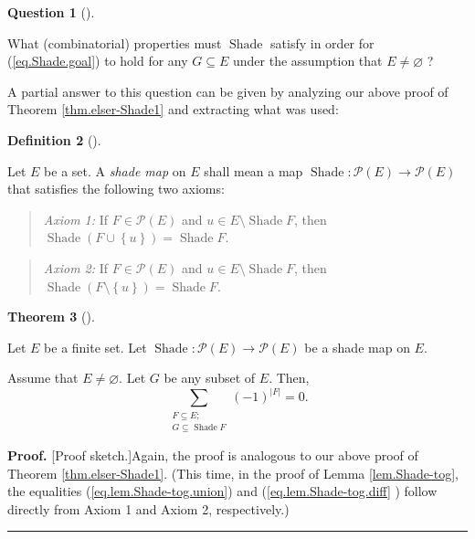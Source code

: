 \documentclass[numbers=enddot,12pt,final,onecolumn]{scrartcl}%
\theoremstyle{definition}
\newtheorem{theo}{Theorem}[section]
\newenvironment{theorem}[1][]
{\begin{theo}[#1]\begin{leftbar}}
{\end{leftbar}\end{theo}}
\newtheorem{defi}[theo]{Definition}
\newenvironment{definition}[1][]
{\begin{defi}[#1]\begin{leftbar}}
{\end{leftbar}\end{defi}}
\newtheorem{quest}[theo]{Question}
\newenvironment{question}[1][]
{\begin{quest}[#1]\begin{leftbar}}
{\end{leftbar}\end{quest}}
\newenvironment{statement}{\begin{quote}}{\end{quote}}
\newenvironment{proof}[1][Proof]{\noindent\textbf{#1.} }{\ \rule{0.5em}{0.5em}}
\newenvironment{question}[1][Question]{\noindent\textbf{#1.} }{\ \rule{0.5em}{0.5em}}
\let\sumnonlimits\sum
\renewcommand{\sum}{\sumnonlimits\limits}
\begin{document}
\begin{question}
What (combinatorial) properties must $\operatorname*{Shade}$ satisfy in order
for (\ref{eq.Shade.goal}) to hold for any $G\subseteq E$ under the assumption
that $E\neq\varnothing$ ?
\end{question}

A partial answer to this question can be given by analyzing our above proof of
Theorem \ref{thm.elser-Shade1} and extracting what was used:

\begin{definition}
\label{def.Shade.shademap}Let $E$ be a set. A \emph{shade map} on $E$ shall
mean a map $\operatorname*{Shade}:\mathcal{P}\left(  E\right)  \rightarrow
\mathcal{P}\left(  E\right)  $ that satisfies the following two axioms:

\begin{statement}
\textit{Axiom 1:} If $F\in\mathcal{P}\left(  E\right)  $ and $u\in
E\setminus\operatorname*{Shade}F$, then $\operatorname*{Shade}\left(
F\cup\left\{  u\right\}  \right)  =\operatorname*{Shade}F$.
\end{statement}

\begin{statement}
\textit{Axiom 2:} If $F\in\mathcal{P}\left(  E\right)  $ and $u\in
E\setminus\operatorname*{Shade}F$, then $\operatorname*{Shade}\left(
F\setminus\left\{  u\right\}  \right)  =\operatorname*{Shade}F$.
\end{statement}
\end{definition}

\begin{theorem}
\label{thm.elser.genE0}Let $E$ be a finite set. Let $\operatorname*{Shade}%
:\mathcal{P}\left(  E\right)  \rightarrow\mathcal{P}\left(  E\right)  $ be a
shade map on $E$.

Assume that $E\neq\varnothing$. Let $G$ be any subset of $E$. Then,%
\[
\sum_{\substack{F\subseteq E;\\G\subseteq\operatorname*{Shade}F}}\left(
-1\right)  ^{\left\vert F\right\vert }=0.
\]

\end{theorem}

\begin{proof}
[Proof sketch.]Again, the proof is analogous to our above proof of Theorem
\ref{thm.elser-Shade1}. (This time, in the proof of Lemma \ref{lem.Shade-tog},
the equalities (\ref{eq.lem.Shade-tog.union}) and (\ref{eq.lem.Shade-tog.diff}%
) follow directly from Axiom 1 and Axiom 2, respectively.)
\end{proof}
\end{document}
